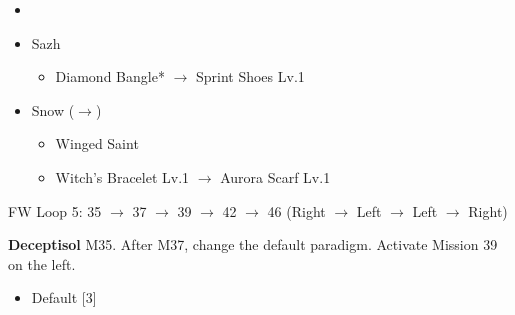 \begin{menu}
	\begin{itemize}
	\paradigm
		\begin{itemize}
			\item {}%
				{\paradigmline{\com}{\sen}{\med}}%
				{\paradigmline[4]{\com}{\com}{\sab}}%
				{\paradigmline{(\syn)}{\sen}{(\sab)}}%
				{\paradigmline{\rav}{\rav}{\rav}}%
				{\paradigmline{\sab}{\sen}{\sab}}%
				{\paradigmline{\rav}{\sen}{\rav}}%
		\end{itemize}
	\equip
		\begin{itemize}
			\item Sazh
				\begin{itemize}
					\item Diamond Bangle* $\rightarrow$ Sprint Shoes Lv.1
				\end{itemize}
			\item Snow ($\rightarrow$)
				\begin{itemize}
					\item Winged Saint
					\item Witch's Bracelet Lv.1 $\rightarrow$ Aurora Scarf Lv.1
				\end{itemize}
		\end{itemize}
	\end{itemize}
\end{menu}

\renewcommand{\third}{[3] Premeditation (\syn/\sen/\sab)}

FW Loop 5: 35 $\rightarrow$ 37 $\rightarrow$ 39 $\rightarrow$ 42 $\rightarrow$ 46 (Right $\rightarrow$ Left $\rightarrow$ Left $\rightarrow$ Right)

\textbf{Deceptisol} M35.
After M37, change the default paradigm.
Activate Mission 39 on the left.

\begin{menu}
	\begin{itemize}
	\paradigm
		\begin{itemize}
			\item Default [3]
		\end{itemize}
	\end{itemize}
\end{menu}

